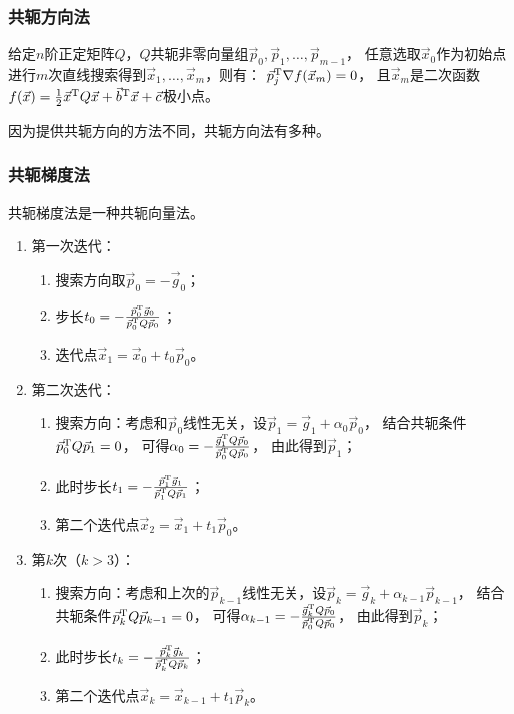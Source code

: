 \subsubsection{共轭方向法}

\begin{theorem}
    给定$n$阶正定矩阵$Q$，$Q$共轭非零向量组$\vec{p}_0,\vec{p}_1,\dots,\vec{p}_{m-1}$，
    任意选取$\vec{x}_0$作为初始点进行$m$次直线搜索得到$\vec{x}_1,\dots,\vec{x}_{m}$，则有：
    $\vec{p}_j^\mathrm{T} \nabla f(\vec{x}_m) = 0$，
    且$\vec{x}_m$是二次函数$f(\vec{x})=\frac{1}{2}\vec{x}^\mathrm{T} Q \vec{x}+\vec{b}^\mathrm{T}\vec{x}+\vec{c}$极小点。
\end{theorem}

因为提供共轭方向的方法不同，共轭方向法有多种。

\subsubsection{共轭梯度法}

共轭梯度法是一种共轭向量法。

\begin{enumerate}
    \item 第一次迭代：
    \begin{enumerate}
        \item 搜索方向取$\vec{p}_0=-\vec{g}_0$；
        \item 步长$t_0=-\frac{\vec{p}_0^\mathrm{T}\vec{g}_0}{\vec{p}_0^\mathrm{T} Q \vec{p}_0}$；
        \item 迭代点$\vec{x}_1=\vec{x}_0+t_0\vec{p}_0$。
    \end{enumerate}
    \item 第二次迭代：
    \begin{enumerate}
        \item
        搜索方向：考虑和$\vec{p}_0$线性无关，设$\vec{p}_1=\vec{g}_1+\alpha_0 \vec{p}_0$，
        结合共轭条件$\vec{p}_0^\mathrm{T} Q \vec{p}_1=0$，
        可得$\alpha_0 = -\frac{\vec{g}_1^\mathrm{T} Q \vec{p}_0}{\vec{p}_0^\mathrm{T} Q\vec{p}_0}$，
        由此得到$\vec{p}_1$；
        \item 此时步长$t_1 = -\frac{\vec{p}_1^\mathrm{T} \vec{g}_1}{\vec{p}_1^\mathrm{T} Q \vec{p}_1 }$；
        \item 第二个迭代点$\vec{x}_2=\vec{x}_1+t_1\vec{p}_0$。
    \end{enumerate}
    \item 第$k$次（$k>3$）：
    \begin{enumerate}
        \item
        搜索方向：考虑和上次的$\vec{p}_{k-1}$线性无关，设$\vec{p}_k=\vec{g}_k+\alpha_{k-1} \vec{p}_{k-1}$，
        结合共轭条件$\vec{p}_k^\mathrm{T} Q \vec{p}_{k-1}=0$，
        可得$\alpha_{k-1} = -\frac{\vec{g}_k^\mathrm{T} Q \vec{p}_0}{\vec{p}_0^\mathrm{T} Q\vec{p}_0}$，
        由此得到$\vec{p}_k$；
        \item 此时步长$t_k = -\frac{\vec{p}_k^\mathrm{T} \vec{g}_k}{\vec{p}_k^\mathrm{T} Q \vec{p}_k }$；
        \item 第二个迭代点$\vec{x}_k = \vec{x}_{k-1}+t_1\vec{p}_k$。
    \end{enumerate}
\end{enumerate}

